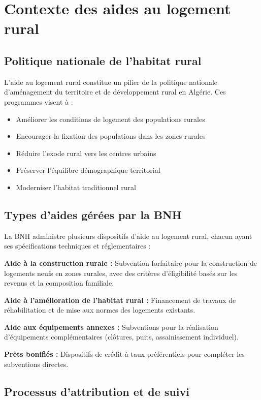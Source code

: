\section{Contexte des aides au logement rural}

\subsection{Politique nationale de l'habitat rural}

L'aide au logement rural constitue un pilier de la politique nationale d'aménagement du territoire et de développement rural en Algérie. Ces programmes visent à :

\begin{itemize}
    \item Améliorer les conditions de logement des populations rurales
    \item Encourager la fixation des populations dans les zones rurales
    \item Réduire l'exode rural vers les centres urbains
    \item Préserver l'équilibre démographique territorial
    \item Moderniser l'habitat traditionnel rural
\end{itemize}

\subsection{Types d'aides gérées par la BNH}

La BNH administre plusieurs dispositifs d'aide au logement rural, chacun ayant ses spécifications techniques et réglementaires :

\medskip

\textbf{Aide à la construction rurale :} Subvention forfaitaire pour la construction de logements neufs en zones rurales, avec des critères d'éligibilité basés sur les revenus et la composition familiale.

\textbf{Aide à l'amélioration de l'habitat rural :} Financement de travaux de réhabilitation et de mise aux normes des logements existants.

\textbf{Aide aux équipements annexes :} Subventions pour la réalisation d'équipements complémentaires (clôtures, puits, assainissement individuel).

\textbf{Prêts bonifiés :} Dispositifs de crédit à taux préférentiels pour compléter les subventions directes.

\subsection{Processus d'attribution et de suivi}

